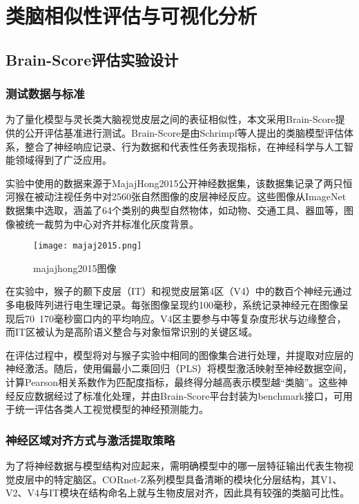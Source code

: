 \chapter{类脑相似性评估与可视化分析}

\section{Brain-Score评估实验设计}

\subsection{测试数据与标准}

为了量化模型与灵长类大脑视觉皮层之间的表征相似性，本文采用Brain-Score提供的公开评估基准进行测试。Brain-Score是由Schrimpf等人提出的类脑模型评估体系，整合了神经响应记录、行为数据和代表性任务表现指标，在神经科学与人工智能领域得到了广泛应用。

实验中使用的数据来源于MajajHong2015公开神经数据集，该数据集记录了两只恒河猴在被动注视任务中对2560张自然图像的皮层神经反应。这些图像从ImageNet数据集中选取，涵盖了64个类别的典型自然物体，如动物、交通工具、器皿等，图像被统一裁剪为中心对齐并标准化灰度背景。

\begin{figure}[hbt]
	\centering
	\texttt{[image: majaj2015.png]}
	\caption{majajhong2015图像}
	\label{f.majajhong}
\end{figure}

在实验中，猴子的颞下皮层（IT）和视觉皮层第4区（V4）中的数百个神经元通过多电极阵列进行电生理记录。每张图像呈现约100毫秒，系统记录神经元在图像呈现后70~170毫秒窗口内的平均响应。V4区主要参与中等复杂度形状与边缘整合，而IT区被认为是高阶语义整合与对象恒常识别的关键区域。

在评估过程中，模型将对与猴子实验中相同的图像集合进行处理，并提取对应层的神经激活。随后，使用偏最小二乘回归（PLS）将模型激活映射至神经数据空间，计算Pearson相关系数作为匹配度指标，最终得分越高表示模型越“类脑”。这些神经反应数据经过了标准化处理，并由Brain-Score平台封装为benchmark接口，可用于统一评估各类人工视觉模型的神经预测能力。

\subsection{神经区域对齐方式与激活提取策略}

为了将神经数据与模型结构对应起来，需明确模型中的哪一层特征输出代表生物视觉皮层中的特定脑区。CORnet-Z系列模型具备清晰的模块化分层结构，其V1、V2、V4与IT模块在结构命名上就与生物皮层对齐，因此具有较强的类脑可比性。

